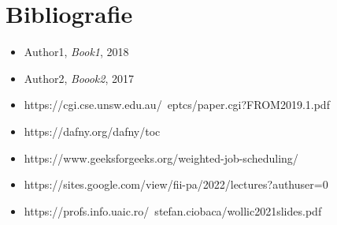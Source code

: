 \chapter*{Bibliografie} 

\begin{itemize}
    \item Author1, \textit{Book1}, 2018
    \item Author2, \textit{Boook2}, 2017
    \item https://cgi.cse.unsw.edu.au/~eptcs/paper.cgi?FROM2019.1.pdf
    \item https://dafny.org/dafny/toc
    \item https://www.geeksforgeeks.org/weighted-job-scheduling/
    \item https://sites.google.com/view/fii-pa/2022/lectures?authuser=0
    \item https://profs.info.uaic.ro/~stefan.ciobaca/wollic2021slides.pdf
\end{itemize}